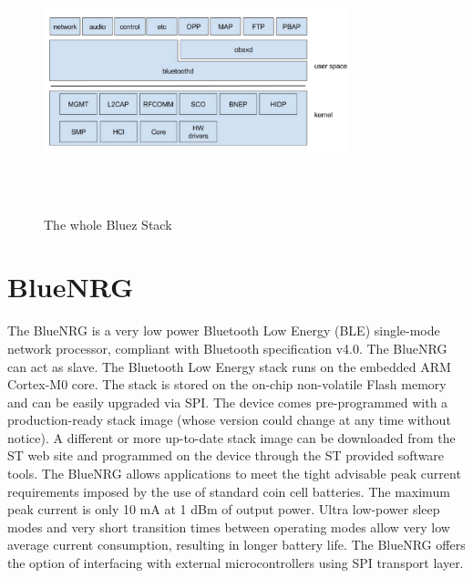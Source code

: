 \begin{figure}[ht]
	\centering
	\includegraphics[width=3.5in, height=3in]{images/whole_bluez.png}
	\caption{The whole Bluez Stack}
\end{figure}
\section{BlueNRG}
The BlueNRG is a very low power Bluetooth Low Energy (BLE) single-mode network processor, compliant with Bluetooth specification v4.0. The BlueNRG can act as slave. The Bluetooth Low Energy stack runs on the embedded ARM Cortex-M0 core. The stack is stored on the on-chip non-volatile Flash memory and can be easily upgraded via SPI. The device comes pre-programmed with a production-ready stack image (whose version could change at any time without notice). A different or more up-to-date stack image can be downloaded from the ST web site and programmed on the device through the ST provided software tools. The BlueNRG allows applications to meet the tight advisable peak current requirements imposed by the use of standard coin cell batteries. The maximum peak current is only 10 mA at 1 dBm of output power. Ultra low-power sleep modes and very short transition times between operating modes allow very low average current consumption, resulting in longer battery life. The BlueNRG offers the option of interfacing with external microcontrollers using SPI transport layer.
